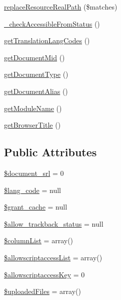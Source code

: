 \begin{DoxyCompactItemize}
\hyperlink{classdocumentItem_a47d377b1f8ae94615b363f4f00bc94fc}{replace\-Resource\-Real\-Path} (\$matches)
\item 
\hyperlink{classdocumentItem_a16bc4bb18f4e29b0244e647eb89e2f45}{\-\_\-check\-Accessible\-From\-Status} ()
\item 
\hyperlink{classdocumentItem_afd284f32681755444c28e93c14f55c28}{get\-Translation\-Lang\-Codes} ()
\item 
\hyperlink{classdocumentItem_ae8d90b15c65199e9acb4622b3da43119}{get\-Document\-Mid} ()
\item 
\hyperlink{classdocumentItem_a393ee98eeada92d1bd3b41f5018f746e}{get\-Document\-Type} ()
\item 
\hyperlink{classdocumentItem_adad3fafeaac19dfed4bea9e5709677d4}{get\-Document\-Alias} ()
\item 
\hyperlink{classdocumentItem_abc1a8bc25ecdbf936fba6e62b773b01c}{get\-Module\-Name} ()
\item 
\hyperlink{classdocumentItem_a386ced6121facbf9f54c2675afb8a037}{get\-Browser\-Title} ()
\end{DoxyCompactItemize}
\subsection*{Public Attributes}
\begin{DoxyCompactItemize}
\item 
\hyperlink{classdocumentItem_a87159d1cf24944d081646e6fe4f7e0f6}{\$document\-\_\-srl} = 0
\item 
\hyperlink{classdocumentItem_a5fa7aa5d52f248116250e95126e8ab87}{\$lang\-\_\-code} = null
\item 
\hyperlink{classdocumentItem_af1bde72448d1519839d6d07ff873effe}{\$grant\-\_\-cache} = null
\item 
\hyperlink{classdocumentItem_aaf08d80bedc01fc0fc0370677a4ba9cc}{\$allow\-\_\-trackback\-\_\-status} = null
\item 
\hyperlink{classdocumentItem_a244e1382304e15c5ae29e3311ef8e865}{\$column\-List} = array()
\item 
\hyperlink{classdocumentItem_a3b10cc840f3a20580d3ab2269ef24df3}{\$allowscriptaccess\-List} = array()
\item 
\hyperlink{classdocumentItem_ab4273ebe05df985235bf651d918bd4f8}{\$allowscriptaccess\-Key} = 0
\item 
\hyperlink{classdocumentItem_a70d4321ea0edfb6c1fb0775ced8a6b41}{\$uploaded\-Files} = array()
\end{DoxyCompactItemize}


